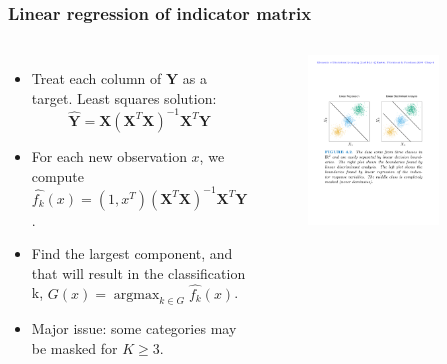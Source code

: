 \documentclass[aspectratio=169]{beamer}
\DeclareMathOperator*{\argmax}{argmax}
\let \vec \mathbf
\begin{document}
\begin{frame}
\frametitle{Linear regression of indicator matrix}
\begin{columns}
    \begin{itemize}
        \item Treat each column of $\vec{Y}$ as a target. Least squares solution:
        \begin{equation*}
            \hat{\vec{Y}} = \vec{X}(\vec{X}^T\vec{X})^{-1}\vec{X}^T\vec{Y}
        \end{equation*}
        \item For each new observation $x$, we compute $\hat{f_k}(x) = (1, x^T)(\vec{X}^T\vec{X})^{-1}\vec{X}^T\vec{Y}$.
        \item Find the largest component, and that will result in the classification k, $G(x) = \argmax_{k \in G} \hat{f_k}(x)$.
        \item Major issue: some categories may be masked for $K \geq 3$.
    \end{itemize}
    \begin{figure}
        \centering
        \includegraphics[width=0.8\textwidth]{figures/linearclassifier.pdf}
    \end{figure}
\end{columns}
\end{frame} 
\end{document}
